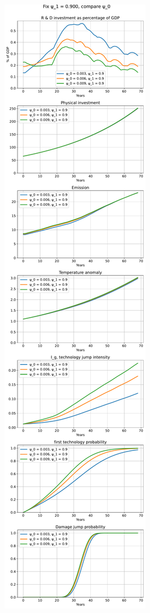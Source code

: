\documentclass{article}
\begin{document}
	\begin{figure}
	\centering
	\includegraphics{../figures/psi_1_0.900.pdf}
	\end{figure}
\end{document}
